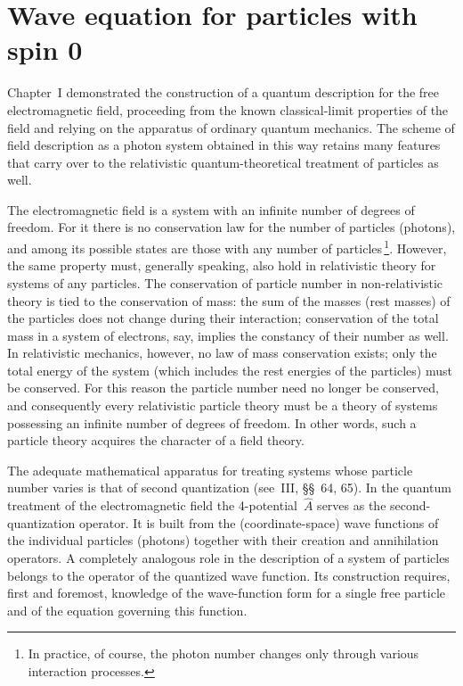 \section{Wave equation for particles with spin 0}

Chapter~I demonstrated the construction of a quantum description for the free electromagnetic field, proceeding from the known classical-limit properties of the field and relying on the apparatus of ordinary quantum mechanics. The scheme of field description as a photon system obtained in this way retains many features that carry over to the relativistic quantum-theoretical treatment of particles as well.

The electromagnetic field is a system with an infinite number of degrees of freedom. For it there is no conservation law for the number of particles (photons), and among its possible states are those with any number of particles\,\footnote{In practice, of course, the photon number changes only through various interaction processes.}. However, the same property must, generally speaking, also hold in relativistic theory for systems of any particles. The conservation of particle number in non-relativistic theory is tied to the conservation of mass: the sum of the masses (rest masses) of the particles does not change during their interaction; conservation of the total mass in a system of electrons, say, implies the constancy of their number as well. In relativistic mechanics, however, no law of mass conservation exists; only the total energy of the system (which includes the rest energies of the particles) must be conserved. For this reason the particle number need no longer be conserved, and consequently every relativistic particle theory must be a theory of systems possessing an infinite number of degrees of freedom. In other words, such a particle theory acquires the character of a field theory.

The adequate mathematical apparatus for treating systems whose particle number varies is that of second quantization (see~III, \S\S~64, 65). In the quantum treatment of the electromagnetic field the 4-potential~$\hat{A}$ serves as the second-quantization operator. It is built from the (coordinate-space) wave functions of the individual particles (photons) together with their creation and annihilation operators. A completely analogous role in the description of a system of particles belongs to the operator of the quantized wave function. Its construction requires, first and foremost, knowledge of the wave-function form
for a single free particle and of the equation governing this function.

